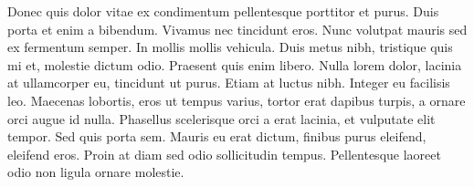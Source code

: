 \documentclass[11pt,fleqn]{book} %
\begin{document}
Donec quis dolor vitae ex condimentum pellentesque porttitor et purus. Duis porta et enim a bibendum. Vivamus nec tincidunt eros. Nunc volutpat mauris sed ex fermentum semper. In mollis mollis vehicula. Duis metus nibh, tristique quis mi et, molestie dictum odio. Praesent quis enim libero. Nulla lorem dolor, lacinia at ullamcorper eu, tincidunt ut purus. Etiam at luctus nibh. Integer eu facilisis leo. Maecenas lobortis, eros ut tempus varius, tortor erat dapibus turpis, a ornare orci augue id nulla. Phasellus scelerisque orci a erat lacinia, et vulputate elit tempor. Sed quis porta sem. Mauris eu erat dictum, finibus purus eleifend, eleifend eros. Proin at diam sed odio sollicitudin tempus. Pellentesque laoreet odio non ligula ornare molestie.
\newpage
    
    
    
    
    
    
    
    
\end{document}
